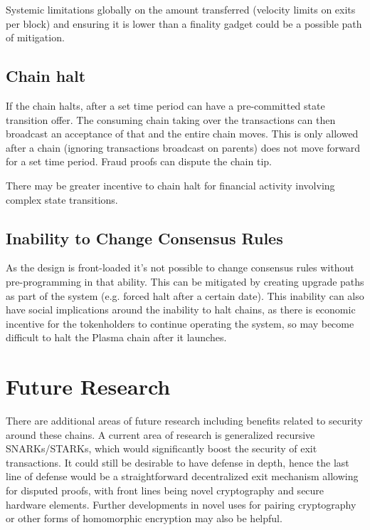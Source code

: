 \documentclass[letterpaper, 11pt]{article}
\begin{document}
Systemic limitations globally on the amount transferred (velocity limits on
exits per block) and ensuring it is lower than a finality gadget could be a
possible path of mitigation.

\subsection{Chain halt}

If the chain halts, after a set time period can have a pre-committed state
transition offer. The consuming chain taking over the transactions can then
broadcast an acceptance of that and the entire chain moves. This is only
allowed after a chain (ignoring transactions broadcast on parents) does not
move forward for a set time period. Fraud proofs can dispute the chain tip.

There may be greater incentive to chain halt for financial activity involving
complex state transitions.

\subsection{Inability to Change Consensus Rules}

As the design is front-loaded it's not possible to change consensus rules
without pre-programming in that ability. This can be mitigated by creating
upgrade paths as part of the system (e.g. forced halt after a certain date).
This inability can also have social implications around the inability to halt
chains, as there is economic incentive for the tokenholders to continue
operating the system, so may become difficult to halt the Plasma chain after it
launches.

\section{Future Research}

There are additional areas of future research including benefits related to
security around these chains. A current area of research is generalized
recursive SNARKs/STARKs, which would significantly boost the security of exit
transactions. It could still be desirable to have defense in depth, hence the
last line of defense would be a straightforward decentralized exit mechanism
allowing for disputed proofs, with front lines being novel cryptography and
secure hardware elements. Further developments in novel uses for pairing
cryptography or other forms of homomorphic encryption may also be helpful.
\end{document}
